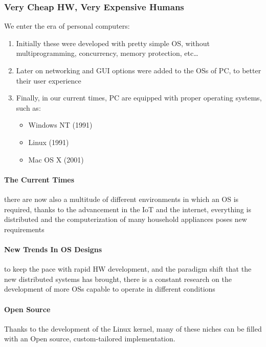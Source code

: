 \documentclass[openright, twoside]{report}
\theoremstyle{definition}
\theoremstyle{example}
\begin{document}
	\clearpage

	\subsubsection{Very Cheap HW, Very Expensive Humans}

	We enter the era of personal computers:

	\begin{enumerate}
		\item Initially these were developed with pretty simple OS, without multiprogramming,
			concurrency, memory protection, etc\dots

		\item Later on networking and GUI options were added to the OSs of PC, to better their
			user experience

		\item Finally, in our current times, PC are equipped with proper operating systems, such as:
		\begin{itemize}
			\item Windows NT (1991)
			\item Linux (1991)
			\item Mac OS X (2001)
		\end{itemize}

	\end{enumerate}

	\paragraph{The Current Times} there are now also a multitude of different environments in which an OS is required, thanks
	to the advancement in the IoT and the internet, everything is distributed and the computerization
	of many household appliances poses new requirements

	\paragraph{New Trends In OS Designs} to keep the pace with rapid HW development, and the paradigm
	shift that the new distributed systems has brought, there is a constant research on the development of more OSs
	capable to operate in different conditions

	\paragraph{Open Source}
	Thanks to the development of the Linux kernel, many of these niches can be filled with an Open
	source, custom-tailored implementation.
\end{document}
